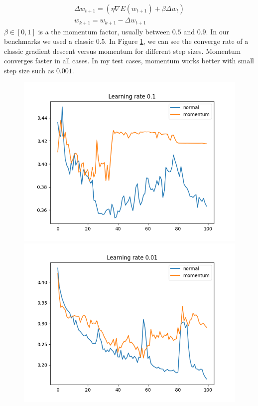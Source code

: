 \documentclass[11pt]{article}
\begin{document}
\begin{equation}
	\label{eq: momentum}
	\begin{split}
	\Delta w_{ t + 1} = (\eta \nabla E(w_{t + 1}) + \beta \Delta w_t) \\
	 w_{k + 1} = w_{k + 1} -   \Delta w_{ t + 1}
	 \end{split}
\end{equation}
$\beta \in [0,1]$ is a the momentum factor, usually between $0.5$ and $0.9$. In our benchmarks we used a classic $0.5$. In Figure \ref{fig:momentum}, we can see the converge rate of a classic gradient descent versus momentum for different step sizes. Momentum converges faster in all cases. In my test cases, momentum works better with small step size such as $0.001$.
\begin{figure}[H]
\label{fig:momentum}
\centering
\includegraphics[scale=0.5]{images/momentum_plot_0,1.png}	
\includegraphics[scale=0.5]{images/momentum_plot_0,01.png}	

\end{figure}
\end{document}
